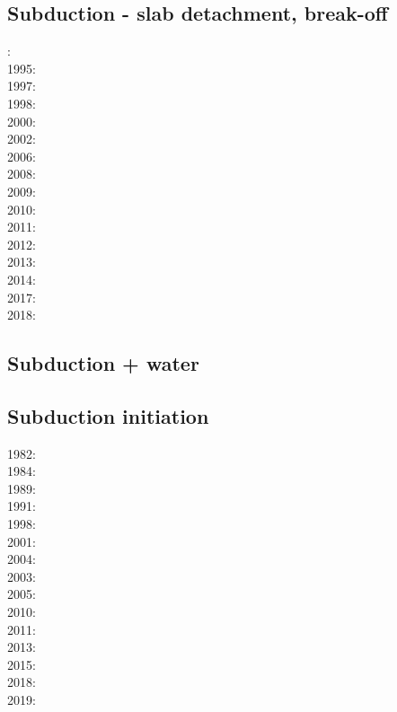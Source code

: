 \subsection*{Subduction - slab detachment, break-off}

: \cite{wosp92}\\
1995: \cite{yowo95}\\
1997: \cite{wowo97}\\
1998: \cite{desw98}\cite{caws98}\\
2000: \cite{wosp00}\\
2002: \cite{bugw02}\\
2006: \cite{fabm06}\\
2008: \cite{zlfd08}\\
2009: \cite{anbi09}\cite{bubi09}\\
2010: \cite{bubi10}\\
2011: \cite{dugm11}\\
2012: \cite{dugk12}\cite{dusg12}\\
2013: \cite{care13}\cite{mafv13}\\
2014: \cite{dugs14}\cite{besr14}\\
2017: \cite{frbm17}\\
2018: \cite{garm18}

\subsection*{Subduction + water}

\cite{fagm12}
\cite{qubu14}

\subsection*{Subduction initiation}

1982: \cite{clwv82}\\
1984: \cite{cade84}\\
1989: \cite{clwv89}\\
1991: \cite{muph91}\\
1998: \cite{togu98}\\
2001: \cite{dohe01}\cite{reyb01}\cite{brry01}\\
2004: \cite{ster04}\\
2003: \cite{hags03}\\
2005: \cite{bihi05}\\
2010: \cite{nigm10}\cite{bucl10}\\
2011: \cite{bagw11}\\
2013: \cite{dyge13}\\
2015: \cite{matv15}\cite{pebu15}\cite{vapm15}\\
2018: \cite{zhlg18}\\
2019: \cite{begb19}

